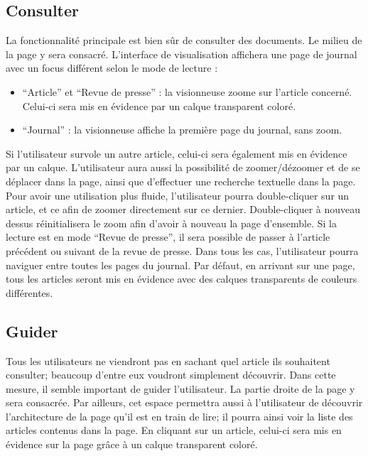 \subsection{Consulter}
\label{sec:consultation_consulter}
La fonctionnalité principale est bien sûr de consulter des documents. Le milieu de la page y sera consacré.
L’interface de visualisation affichera une page de journal avec un focus différent selon le mode de lecture :
\begin{itemize}
\item “Article” et “Revue de presse” : la visionneuse zoome sur l’article concerné. Celui-ci sera mis en évidence par un calque transparent coloré.
\item “Journal” : la visionneuse affiche la première page du journal, sans zoom.
\end{itemize}
\bigskip
\par
Si l’utilisateur survole un autre article, celui-ci sera également mis en évidence par un calque.
	L’utilisateur aura aussi la possibilité de zoomer/dézoomer et de se déplacer dans la page, ainsi que d’effectuer une recherche textuelle dans la page. Pour avoir une utilisation plus fluide, l'utilisateur pourra double-cliquer sur un article, et ce afin de zoomer directement sur ce dernier. Double-cliquer à nouveau dessus réinitialisera le zoom afin d'avoir à nouveau la page d'ensemble. Si la lecture est en mode “Revue de presse”, il sera possible de passer à l’article précédent ou suivant de la revue de presse. Dans tous les cas, l'utilisateur pourra naviguer entre toutes les pages du journal. Par défaut, en arrivant sur une page, tous les articles seront mis en évidence avec des calques transparents de couleurs différentes.

\subsection{Guider}
\label{sec:consultation_guider}

	Tous les utilisateurs ne viendront pas en sachant quel article ils souhaitent consulter; beaucoup d’entre eux voudront simplement découvrir. Dans cette mesure, il semble important de guider l’utilisateur. La partie droite de la page y sera consacrée. Par ailleurs, cet espace permettra aussi à l'utilisateur de découvrir l'architecture de la page qu'il est en train de lire; il pourra ainsi voir la liste des articles contenus dans la page. En cliquant sur un article, celui-ci sera mis en évidence sur la page grâce à un calque transparent coloré.

